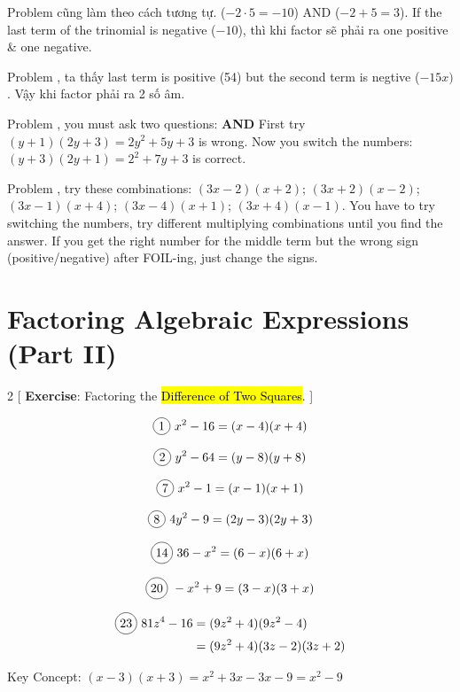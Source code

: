 Problem  cũng làm theo cách tương tự. ($-2\cdot 5=-10$) AND ($-2+5=3$). If the last term of the trinomial is negative ($-10$), thì khi factor sẽ phải ra one positive \& one negative.

Problem , ta thấy last term is positive (54) but the second term is negtive ($-15x)$. Vậy khi factor phải ra 2 số âm.

Problem , you must ask two questions:  \textbf{AND}  First try $(y+1)(2y+3)=2y^{2}+5y+3$ is wrong. Now you switch the numbers: $(y+3)(2y+1)=2^{2}+7y+3$ is correct.

Problem , try these combinations: $(3x-2)(x+2)$; $(3x+2)(x-2)$; $(3x-1)(x+4)$; $(3x-4)(x+1)$; $(3x+4)(x-1)$. You have to try switching the numbers, try different multiplying combinations until you find the answer. If you get the right number for the middle term but the wrong sign (positive/negative) after FOIL-ing, just change the signs.

\section{Factoring Algebraic Expressions (Part II)}

\begin{multicols}{2}
[
  \textbf{Exercise}: Factoring the \hl{Difference of Two Squares}.
]

\begin{align*}
  \circled{1}\ x^{2}-16=(x-4)(x+4)
\end{align*}

  \[\circled{2}\ y^{2}-64=(y-8)(y+8)\]

  \[\circled{7}\ x^{2}-1=(x-1)(x+1)\]

  \[\circled{8}\ 4y^{2}-9=(2y-3)(2y+3)\]

  \[\circled{14}\ 36-x^{2}=(6-x)(6+x)\]

  \[\circled{20}\ -x^{2}+9=(3-x)(3+x)\]

\begin{align*}
  \circled{23}\ 81z^{4}-16&=(9z^{2}+4)(9z^{2}-4)\\
  &=(9z^{2}+4)(3z-2)(3z+2)
\end{align*}
\end{multicols}

Key Concept: $(x-3)(x+3)=x^{2}+3x-3x-9=x^{2}-9$

\vspace{.6cm}

